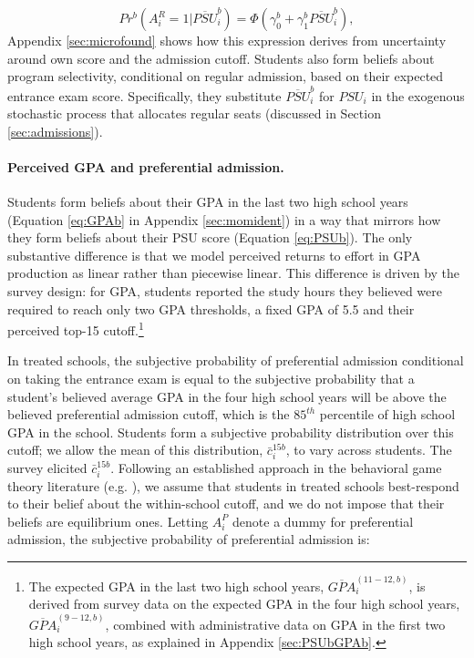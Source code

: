 \vspace{-12pt}
\begin{equation}\label{eq:pr_Rb}
	Pr^b(A^R_i=1|\overline{PSU}^b_{i})=\Phi\left(\gamma_0^b +\gamma_1^b \overline{PSU}^b_{i}\right),
\end{equation}
\noindent Appendix \ref{sec:microfound} shows how this expression derives from uncertainty around own score and the admission cutoff. Students also form beliefs about program selectivity, conditional on regular admission, based on their expected entrance exam score. Specifically, they substitute $\overline{PSU}_i^b$ for $PSU_i$ in the exogenous stochastic process that allocates regular seats (discussed in Section \ref{sec:admissions}).\par 


\paragraph{Perceived GPA and preferential admission.} Students form beliefs about their GPA in the last two high school years (Equation \eqref{eq:GPAb} in Appendix \ref{sec:momident}) in a way that mirrors how they form beliefs about their PSU score (Equation \eqref{eq:PSUb}).
The only substantive difference is that we model perceived returns to effort in GPA production as linear rather than piecewise linear. This difference is driven by the survey design: for GPA, students reported the study hours they believed were required to reach only two GPA thresholds, a fixed GPA of 5.5 and their perceived top-15 cutoff.\footnote{The expected GPA in the last two high school years, $\overline{GPA}^{(11-12,b)}_{i}$, is derived from survey data on the expected GPA in the four high school years, $\overline{GPA}^{(9-12,b)}_{i}$, combined with administrative data on GPA in the first two high school years, as explained in Appendix \ref{sec:PSUbGPAb}.}\par 

In treated schools, the subjective probability of preferential admission conditional on taking the entrance exam is equal to the subjective probability that a student's believed average GPA in the four high school years will be above the believed preferential admission cutoff, which is the $85^{th}$ percentile of high school GPA in the school. Students form a subjective probability distribution over this cutoff; we allow the mean of this distribution, $\bar{c}_i^{15b}$, to vary across students. The survey elicited $\bar{c}_i^{15b}$. Following an established approach in the behavioral game theory literature (e.g. \citealp{stahl1995players,costa2003learning,camerer2004cognitive,costa2006cognition,crawford2007level}), we assume that students in treated schools best-respond to their belief about the within-school cutoff, and we do not impose that their beliefs are equilibrium ones. Letting $A_i^P$ denote a dummy for preferential admission, the subjective probability of preferential admission is:


